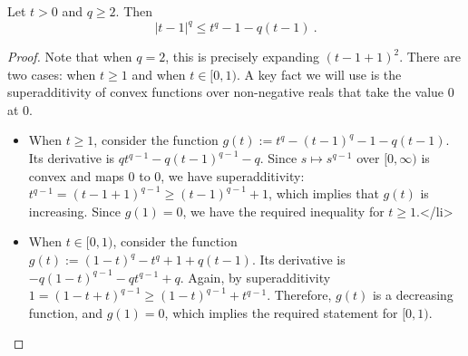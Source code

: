 \documentclass[10pt,a4paper]{amsart}
\begin{document}
\begin{proposition}
\label{prop:algebraic-identity}
Let \(t > 0\) and \(q \geq 2\).
Then
\begin{equation*}
    |t - 1|^{q} \leq t^{q} - 1 - q(t - 1)~.
\end{equation*}
\end{proposition}

\begin{proof}
    Note that when \(q = 2\), this is precisely expanding \((t - 1 + 1)^{2}\).
    There are two cases: when \(t \geq 1\) and when \(t \in [0, 1)\).
    A key fact we will use is the superadditivity of convex functions over non-negative reals that take the value \(0\) at \(0\).
    \begin{itemize}
        \item When \(t \geq 1\), consider the function \(g(t) := t^{q} - (t - 1)^{q} - 1 - q(t - 1)\).
        Its derivative is \(qt^{q - 1} - q(t - 1)^{q - 1} - q\).
        Since \(s \mapsto s^{q - 1}\) over \([0, \infty)\) is convex and maps \(0\) to \(0\), we have superadditivity: \(t^{q - 1} = (t - 1 + 1)^{q - 1} \geq (t - 1)^{q- 1} + 1\), which implies that \(g(t)\) is increasing.
        Since \(g(1) = 0\), we have the required inequality for \(t \geq 1\).</li>
    
        \item When \(t \in [0, 1)\), consider the function \(g(t) := (1 - t)^{q} - t^{q} + 1 + q(t - 1)\).
        Its derivative is \(-q(1 - t)^{q - 1} - qt^{q - 1} + q\).
        Again, by superadditivity \(1 = (1 - t + t)^{q - 1} \geq (1 - t)^{q - 1} + t^{q - 1}\).
        Therefore, \(g(t)\) is a decreasing function, and \(g(1) = 0\), which implies the required statement for \([0, 1)\).
    \end{itemize}
\end{proof}
\end{document}
